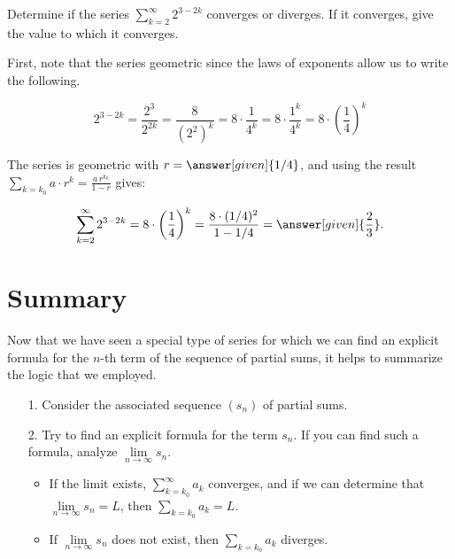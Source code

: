 \documentclass{ximera}
\begin{document}
\begin{question}
Determine if the series $\sum\limits_{k=2}^{\infty} 2^{3-2k}$ converges or diverges.  If it converges, give the value to which it converges.

\begin{explanation}
First, note that the series  geometric since the laws of exponents allow us to write the following.

\[
2^{3-2k} = \frac{2^3}{2^{2k}} = \frac{8}{\left(2^2\right)^k} =  8 \cdot \frac{1}{4^k} =  8 \cdot \frac{1^k}{4^k} =  8 \cdot \left(\frac{1}{4}\right)^k
\]

The series is geometric with $r = \answer[given]{1/4}$, and using the result $\sum\limits_{k=k_0} a \cdot r^k = \frac{a \, r^{k_0}}{1-r}$ gives:

\[
\sum\limits_{k=2}^{\infty} 2^{3-2k} =  8 \cdot \left(\frac{1}{4}\right)^k =  \frac{8 \cdot (1/4)^2}{1-1/4}  =  \answer[given]{\frac{2}{3}}.
\]
\end{explanation}

\end{question}    


























\section*{Summary}
Now that we have seen a special type of series for which we can find an explicit formula for the $n$-th term of the sequence of partial sums, it helps to summarize the logic that we employed.

\begin{itemize}
\item[1.] Consider the associated sequence $(s_n)$ of partial sums.
\item[2.] Try to find an explicit formula for the term $s_n$.  If you can find such a formula, analyze $\lim\limits_{n \to \infty} s_n$.  
\begin{itemize}
\item If the limit exists, $\sum\limits_{k=k_0}^{\infty} a_k$ converges, and if we can determine that $\lim\limits_{n \to \infty} s_n =L$, then $\sum\limits_{k=k_0} a_k=L$.  \item If  $\lim\limits_{n \to \infty} s_n$ does not exist, then $\sum\limits_{k=k_0} a_k$ diverges.
\end{itemize}
\end{itemize}
\end{document}

